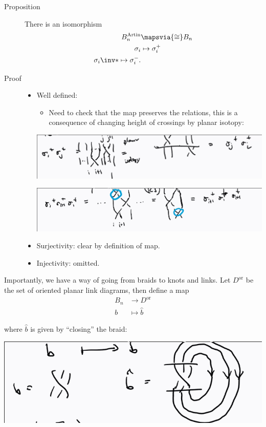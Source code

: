 \begin{description}
\item[Proposition]
There is an isomorphism \begin{align*}
B_n^{\text{Artin}} &\mapsvia{\cong} B_n \\
\sigma_i &\mapsto \sigma_i^+ \\
\sigma_i\inv *\mapsto \sigma_i^-
.\end{align*}
\item[Proof]
\hfill

\begin{itemize}
\item
  Well defined:

  \begin{itemize}
  \tightlist
  \item
    Need to check that the map preserves the relations, this is a
    consequence of changing height of crossings by planar isotopy:
  \end{itemize}

  \includegraphics{figures/image_2020-07-08-11-56-18.png}

  \includegraphics{figures/image_2020-07-08-11-57-06.png}
\item
  Surjectivity: clear by definition of map.
\item
  Injectivity: omitted.
\end{itemize}
\end{description}

Importantly, we have a way of going from braids to knots and links. Let
\(D^{\text{or}}\) be the set of oriented planar link diagrams, then
define a map \begin{align*}
B_n &\to D^{\text{or}} \\
b &\mapsto \hat b
\end{align*}

where \(\hat b\) is given by ``closing'' the braid:

\includegraphics{figures/image_2020-07-08-12-00-35.png}

